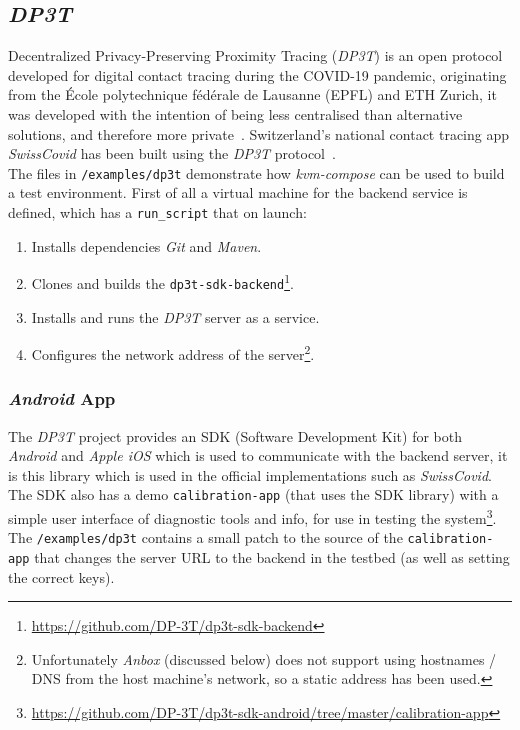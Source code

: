 \documentclass[
    author={Jacob Daniel Halsey},
    supervisor={Prof. Awais Rashid},
    degree={BSc},
    title={Building a Testbed for Evaluating Privacy Enhancing Technologies  (PETs)},
    subtitle={},
    type={software development},
    year={2021}
]{dissertation}
\begin{document}
\subsection{\emph{DP3T}}

Decentralized Privacy-Preserving Proximity Tracing (\emph{DP3T}) is an open protocol developed for
digital contact tracing during the COVID-19 pandemic, originating from the École polytechnique fédérale 
de Lausanne (EPFL) and ETH Zurich, it was developed with the intention of being less centralised
than alternative solutions, and therefore more private~\cite{busvine_2020}. 
Switzerland's national contact tracing app \emph{SwissCovid} 
has been built using the \emph{DP3T} protocol~\cite{swisscovid}. \\

The files in \texttt{/examples/dp3t} demonstrate how \emph{kvm-compose} can be used to build
a test environment. First of all a virtual machine for the backend service is defined,
which has a \texttt{run\_script} that on launch:

\begin{singlespace}
	\begin{enumerate}
		\item Installs dependencies \emph{Git} and \emph{Maven}.
		\item Clones and builds the 
		\texttt{dp3t-sdk-backend}\footnote{\url{https://github.com/DP-3T/dp3t-sdk-backend}}.
		\item Installs and runs the \emph{DP3T} server as a service.
		\item Configures the network address of the server\footnote{
			Unfortunately \emph{Anbox} (discussed below) does not support using hostnames / DNS from 
			the host machine's network, so a static address has been used.}.
	\end{enumerate}
\end{singlespace}

\subsubsection{\emph{Android} App}
\label{sect:android}

The \emph{DP3T} project provides an SDK (Software Development Kit) 
for both \emph{Android} and \emph{Apple iOS} which
is used to communicate with the backend server, it is this library which is used in the official
implementations such as \emph{SwissCovid}. The SDK also has a demo \texttt{calibration-app} (that uses
the SDK library) with a simple user interface of diagnostic tools and info, for use in testing the 
system\footnote{\url{https://github.com/DP-3T/dp3t-sdk-android/tree/master/calibration-app}}.
The \texttt{/examples/dp3t} contains a small patch to the source of the \texttt{calibration-app} that
changes the server URL to the backend in the testbed (as well as setting the correct keys). \\
\end{document}
